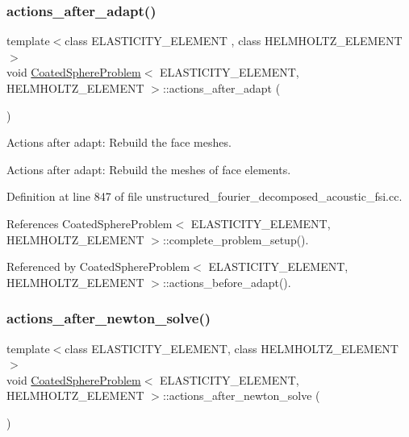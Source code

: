 \subsubsection{\texorpdfstring{actions\+\_\+after\+\_\+adapt()}{actions\_after\_adapt()}}
{\footnotesize\ttfamily template$<$class E\+L\+A\+S\+T\+I\+C\+I\+T\+Y\+\_\+\+E\+L\+E\+M\+E\+NT , class H\+E\+L\+M\+H\+O\+L\+T\+Z\+\_\+\+E\+L\+E\+M\+E\+NT $>$ \\
void \hyperlink{classCoatedSphereProblem}{Coated\+Sphere\+Problem}$<$ E\+L\+A\+S\+T\+I\+C\+I\+T\+Y\+\_\+\+E\+L\+E\+M\+E\+NT, H\+E\+L\+M\+H\+O\+L\+T\+Z\+\_\+\+E\+L\+E\+M\+E\+NT $>$\+::actions\+\_\+after\+\_\+adapt (\begin{DoxyParamCaption}{ }\end{DoxyParamCaption})}



Actions after adapt\+: Rebuild the face meshes. 

Actions after adapt\+: Rebuild the meshes of face elements. 

Definition at line 847 of file unstructured\+\_\+fourier\+\_\+decomposed\+\_\+acoustic\+\_\+fsi.\+cc.



References Coated\+Sphere\+Problem$<$ E\+L\+A\+S\+T\+I\+C\+I\+T\+Y\+\_\+\+E\+L\+E\+M\+E\+N\+T, H\+E\+L\+M\+H\+O\+L\+T\+Z\+\_\+\+E\+L\+E\+M\+E\+N\+T $>$\+::complete\+\_\+problem\+\_\+setup().



Referenced by Coated\+Sphere\+Problem$<$ E\+L\+A\+S\+T\+I\+C\+I\+T\+Y\+\_\+\+E\+L\+E\+M\+E\+N\+T, H\+E\+L\+M\+H\+O\+L\+T\+Z\+\_\+\+E\+L\+E\+M\+E\+N\+T $>$\+::actions\+\_\+before\+\_\+adapt().

\mbox{\label{classCoatedSphereProblem_ae5287efab54b16ec1bd5cced98971c9c}} 
\subsubsection{\texorpdfstring{actions\+\_\+after\+\_\+newton\+\_\+solve()}{actions\_after\_newton\_solve()}\hspace{0.1cm}{\footnotesize\ttfamily [1/2]}}
{\footnotesize\ttfamily template$<$class E\+L\+A\+S\+T\+I\+C\+I\+T\+Y\+\_\+\+E\+L\+E\+M\+E\+NT, class H\+E\+L\+M\+H\+O\+L\+T\+Z\+\_\+\+E\+L\+E\+M\+E\+NT$>$ \\
void \hyperlink{classCoatedSphereProblem}{Coated\+Sphere\+Problem}$<$ E\+L\+A\+S\+T\+I\+C\+I\+T\+Y\+\_\+\+E\+L\+E\+M\+E\+NT, H\+E\+L\+M\+H\+O\+L\+T\+Z\+\_\+\+E\+L\+E\+M\+E\+NT $>$\+::actions\+\_\+after\+\_\+newton\+\_\+solve (\begin{DoxyParamCaption}{ }\end{DoxyParamCaption})\hspace{0.3cm}{\ttfamily [inline]}}



